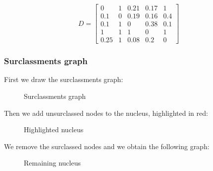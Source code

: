 \documentclass[\main/main.tex]{subfiles}
\begin{document}
\[
	D = \begin{bmatrix}
		0    & 1 & 0.21 & 0.17 & 1   \\
		0.1  & 0 & 0.19 & 0.16 & 0.4 \\
		0.1  & 1 & 0    & 0.38 & 0.1 \\
		1    & 1 & 1    & 0    & 1   \\
		0.25 & 1 & 0.08 & 0.2  & 0
	\end{bmatrix}
\]
\subsubsection*{Surclassments graph}

First we draw the surclassments graph:

\begin{figure}
	\surclassmentGraph{}
	\caption{Surclassments graph}
\end{figure}

Then we add unsurclassed nodes to the nucleus, highlighted in red:

\begin{figure}
	\surclassmentGraphNucleus{}
	\caption{Highlighted nucleus}
\end{figure}

We remove the surclassed nodes and we obtain the following graph:

\begin{figure}
	\surclassmentGraphSecondStep{}
	\caption{Remaining nucleus}
\end{figure}
\end{document}
